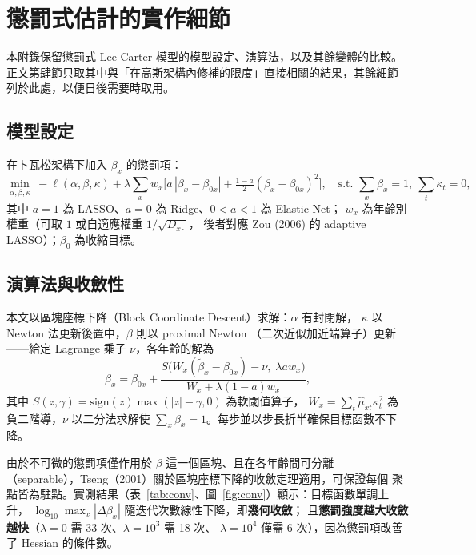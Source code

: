 \documentclass[UTF8, fontset=macnew, a4paper, 12pt]{ctexart}
\newcommand{\bignum}[1]{\ifcase#1\or 壹\or 貳\or 參\or 肆\or 伍\or
  陸\or 柒\or 捌\or 玖\or 拾\fi}
\renewcommand{\thesection}{\bignum{\value{section}}}
\begin{document}
\appendix
\renewcommand{\thesection}{附錄\Alph{section}}
\setcounter{section}{0}

\section{懲罰式估計的實作細節}

本附錄保留懲罰式 Lee-Carter 模型的模型設定、演算法，以及其餘變體的比較。
正文第肆節只取其中與「在高斯架構內修補的限度」直接相關的結果，其餘細節
列於此處，以便日後需要時取用。

\subsection{模型設定}

在卜瓦松架構下加入 $\beta_x$ 的懲罰項：
\begin{equation}
\min_{\alpha,\beta,\kappa}\ -\ell(\alpha,\beta,\kappa)
+\lambda\sum_x w_x\Big[a\,|\beta_x-\beta_{0x}|
+\tfrac{1-a}{2}(\beta_x-\beta_{0x})^2\Big],
\quad \text{s.t. } \sum_x\beta_x=1,\ \sum_t\kappa_t=0,
\end{equation}
其中 $a=1$ 為 LASSO、$a=0$ 為 Ridge、$0<a<1$ 為 Elastic Net；
$w_x$ 為年齡別權重（可取 $1$ 或自適應權重 $1/\sqrt{D_{x\cdot}}$，
後者對應 Zou (2006) 的 adaptive LASSO）；$\beta_0$ 為收縮目標。

\subsection{演算法與收斂性}

本文以區塊座標下降（Block Coordinate Descent）求解：$\alpha$ 有封閉解，
$\kappa$ 以 Newton 法更新後置中，$\beta$ 則以 proximal Newton
（二次近似加近端算子）更新——給定 Lagrange 乘子 $\nu$，各年齡的解為
\begin{equation}
\beta_x=\beta_{0x}+\frac{S\big(W_x(\tilde\beta_x-\beta_{0x})-\nu,\;
\lambda a w_x\big)}{W_x+\lambda(1-a)w_x},
\end{equation}
其中 $S(z,\gamma)=\mathrm{sign}(z)\max(|z|-\gamma,0)$ 為軟閾值算子，
$W_x=\sum_t\hat\mu_{xt}\kappa_t^2$ 為負二階導，$\nu$ 以二分法求解使
$\sum_x\beta_x=1$。每步並以步長折半確保目標函數不下降。

由於不可微的懲罰項僅作用於 $\beta$ 這一個區塊、且在各年齡間可分離
（separable），Tseng（2001）關於區塊座標下降的收斂定理適用，可保證每個
聚點皆為駐點。實測結果（表~\ref{tab:conv}、圖~\ref{fig:conv}）顯示：目標函數單調上升，
$\log_{10}\max_x|\Delta\beta_x|$ 隨迭代次數線性下降，即\textbf{幾何收斂}；
且\textbf{懲罰強度越大收斂越快}（$\lambda=0$ 需 33 次、$\lambda=10^3$ 需 18 次、
$\lambda=10^4$ 僅需 6 次），因為懲罰項改善了 Hessian 的條件數。
\end{document}
